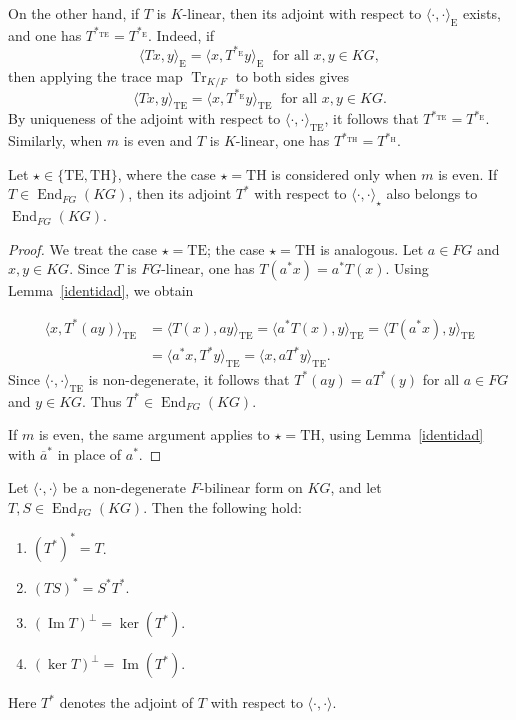 \documentclass[11pt]{article}
\begin{document}
On the other hand, if $T$ is $K$-linear, then its adjoint with respect to $\langle\cdot,\cdot\rangle_{\mathrm{E}}$ exists, and one has $T^{\ast_{\mathrm{TE}}}=T^{\ast_{\mathrm{E}}}$. Indeed, if
$$
\langle Tx,y\rangle_{\mathrm{E}}=\langle x,T^{\ast_{\mathrm{E}}}y\rangle_{\mathrm{E}}\;
\text{ for all }x,y\in KG,
$$
then applying the trace map $\operatorname{Tr}_{K/F}$ to both sides gives
$$
\langle Tx,y\rangle_{\mathrm{TE}}=\langle x,T^{\ast_{\mathrm{E}}}y\rangle_{\mathrm{TE}}\;
\text{ for all }x,y\in KG.
$$
By uniqueness of the adjoint with respect to $\langle\cdot,\cdot\rangle_{\mathrm{TE}}$, it follows that $T^{\ast_{\mathrm{TE}}}=T^{\ast_{\mathrm{E}}}$. Similarly, when $m$ is even and $T$ is $K$-linear, one has $T^{\ast_{\mathrm{TH}}}=T^{\ast_{\mathrm{H}}}$.


\begin{lemma}\label{lem:adjoint-FG-linear}
Let $\star\in\{\mathrm{TE},\mathrm{TH}\}$, where the case $\star=\mathrm{TH}$ is considered only when $m$ is even. If $T\in \operatorname{End}_{FG}(KG)$, then its adjoint $T^\ast$ with respect to $\langle\cdot,\cdot\rangle_\star$ also belongs to $\operatorname{End}_{FG}(KG)$.
\end{lemma}

\begin{proof}
We treat the case $\star=\mathrm{TE}$; the case $\star=\mathrm{TH}$ is analogous. Let $a\in FG$ and $x,y\in KG$. Since $T$ is $FG$-linear, one has $T(a^\ast x)=a^\ast T(x)$. Using Lemma~\ref{identidad}, we obtain

\begin{align*}
\langle x,T^\ast(ay)\rangle_{\mathrm{TE}}
&= \langle T(x),ay\rangle_{\mathrm{TE}}
= \langle a^\ast T(x),y\rangle_{\mathrm{TE}}
= \langle T(a^\ast x),y\rangle_{\mathrm{TE}} \\
&= \langle a^\ast x,T^\ast y\rangle_{\mathrm{TE}}
= \langle x,aT^\ast y\rangle_{\mathrm{TE}}.
\end{align*}
Since $\langle\cdot,\cdot\rangle_{\mathrm{TE}}$ is non-degenerate, it follows that $T^\ast(ay)=aT^\ast(y)$ for all $a\in FG$ and $y\in KG$. Thus $T^\ast\in \operatorname{End}_{FG}(KG)$.

If $m$ is even, the same argument applies to $\star=\mathrm{TH}$, using Lemma~\ref{identidad} with $\overline{a}^\ast$ in place of $a^\ast$.
\end{proof}


\begin{lemma}\label{lem:adjoint-basic}
Let $\langle\cdot,\cdot\rangle$ be a non-degenerate $F$-bilinear form on $KG$, and let $T,S\in \operatorname{End}_{FG}(KG)$. Then the following hold:
\begin{enumerate}
    \item $(T^\ast)^\ast=T$.
    \item $(TS)^\ast=S^\ast T^\ast$.
    \item $(\operatorname{Im}T)^\perp=\ker(T^\ast)$.
    \item $(\ker T)^\perp=\operatorname{Im}(T^\ast)$.
\end{enumerate}
Here $T^\ast$ denotes the adjoint of $T$ with respect to $\langle\cdot,\cdot\rangle$.
\end{lemma}
\end{document}
